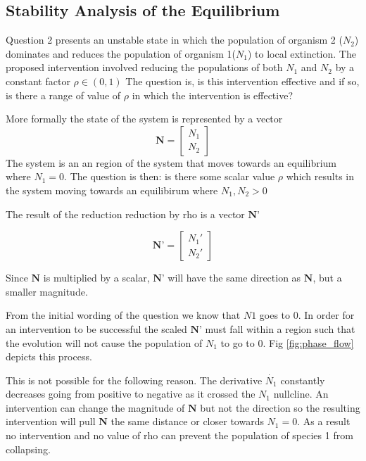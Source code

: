\subsection{Stability Analysis of the Equilibrium}



Question 2 presents an unstable state in which the population of organism 2 ($N_2$) dominates and reduces the population of organism 1($N_1$) to local extinction. The proposed intervention involved reducing the populations of both $N_1$ and $N_2$ by a constant factor $\rho \in (0,1)$ The question is, is this intervention effective and if so, is there a range of value of $\rho$ in which the intervention is effective? 

More formally the state of the system is represented by a vector 
$$ \textbf{N} = \begin{bmatrix}N_1 \\ N_2\end{bmatrix}$$
The system is an an region of the system that moves towards an equilibrium where $N_1=0$. The question is then: is there some scalar value $\rho$ which results in the system moving towards an equilibirum where $N_1, N_2 > 0$

The result of the reduction reduction by rho is a vector $\textbf{N'}$

$$ \textbf{N'} = \begin{bmatrix}N_1' \\ N_2'\end{bmatrix}$$

Since $\textbf{N}$ is multiplied by a scalar, $\textbf{N'}$ will have the same direction as $\textbf{N}$, but a smaller magnitude. 

From the initial wording of the question we know that $N1$ goes to 0. In order for an intervention to be successful the scaled $\textbf{N'}$ must fall within a region such that the evolution will not cause the population of  $N_1$ to go to 0. Fig \ref{fig:phase_flow} depicts this process. 

This is not possible for the following reason. The derivative $\dot{N_1} $ constantly decreases going from positive to negative as it crossed the $N_1$ nullcline. An intervention can change the magnitude of $\textbf{N}$ but not the direction so the resulting intervention will pull $\textbf{N}$ the same distance or closer towards $N_1 = 0$. As a result no intervention and no value of rho can prevent the population of species 1 from collapsing. 


